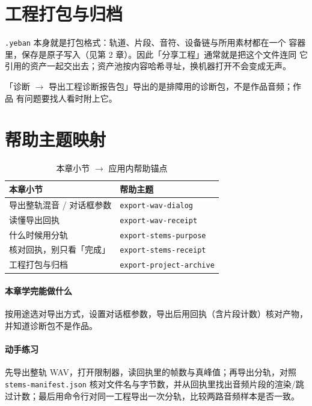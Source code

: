 \section{工程打包与归档}

\texttt{.yeban} 本身就是打包格式：轨道、片段、音符、设备链与所用素材都在一个
容器里，保存是原子写入（见第 2 章）。因此「分享工程」通常就是把这个文件连同
它引用的资产一起交出去；资产池按内容哈希寻址，换机器打开不会变成无声。

「诊断 $\to$ 导出工程诊断报告包」导出的是排障用的诊断包，不是作品音频；作品
有问题要找人看时附上它。

\section{帮助主题映射}

\begin{table}[htbp]
\centering
\caption{本章小节 $\to$ 应用内帮助锚点}
\label{tab:ch08-help}
\begin{tabular}{ll}
\hline
本章小节 & 帮助主题 \\
\hline
导出整轨混音 / 对话框参数 & \texttt{export-wav-dialog} \\
读懂导出回执 & \texttt{export-wav-receipt} \\
什么时候用分轨 & \texttt{export-stems-purpose} \\
核对回执，别只看「完成」 & \texttt{export-stems-receipt} \\
工程打包与归档 & \texttt{export-project-archive} \\
\hline
\end{tabular}
\end{table}

\paragraph{本章学完能做什么} 按用途选对导出方式，设置对话框参数，导出后用回执（含片段计数）核对产物，并知道诊断包不是作品。

\paragraph{动手练习} 先导出整轨 WAV，打开限制器，读回执里的帧数与真峰值；再导出分轨，对照 \texttt{stems-manifest.json} 核对文件名与字节数，并从回执里找出音频片段的渲染/跳过计数；最后用命令行对同一工程导出一次分轨，比较两路音频样本是否一致。
